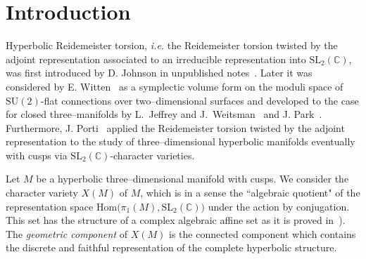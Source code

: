 \documentclass[a4paper]{amsart}
\theoremstyle{plain}
\theoremstyle{definition}
\theoremstyle{remark}
\newcommand{\CC}{{\mathbb C}}
\newcommand{\SU}{{\mathrm{SU}(2)}}
\newcommand{\SL}{{\mathrm{SL}_2(\CC)}}
\begin{document}
\maketitle



\section{Introduction}

Hyperbolic Reidemeister torsion, \emph{i.e.} the Reidemeister torsion
twisted by the adjoint representation associated to an irreducible
representation into $\SL$, was first introduced by D. Johnson in
unpublished notes~\cite{Johnson}. Later it was considered by
E. Witten~\cite{Witten:1991} as a symplectic volume form on the moduli
space of $\SU$-flat connections over two--dimensional surfaces and
developed to the case for closed three--manifolds by L.~Jeffrey and
 J.~Weitsman~\cite{JeffreyWeitsman:1993} and
J. Park~\cite{JPark:1997}. Furthermore, J. Porti~\cite{Porti:1997} applied the Reidemeister torsion
twisted by the adjoint representation to the study of three--dimensional hyperbolic manifolds eventually with cusps via $\SL$-character varieties.

Let $M$ be a hyperbolic three--dimensional manifold with
cusps. We consider the character variety $X(M)$ of $M$, which is in a
sense the ``algebraic quotient" of the representation space
$\mathrm{Hom}\big(\pi_1(M), \SL\big)$ under the action by conjugation. This set
has the structure of a complex algebraic affine set as it is proved in~\cite{CS:1983, LubotzkyMagid85}). The
\emph{geometric component} of $X(M)$ is the connected component which
contains the discrete and faithful representation of the complete
hyperbolic structure.
\end{document}
